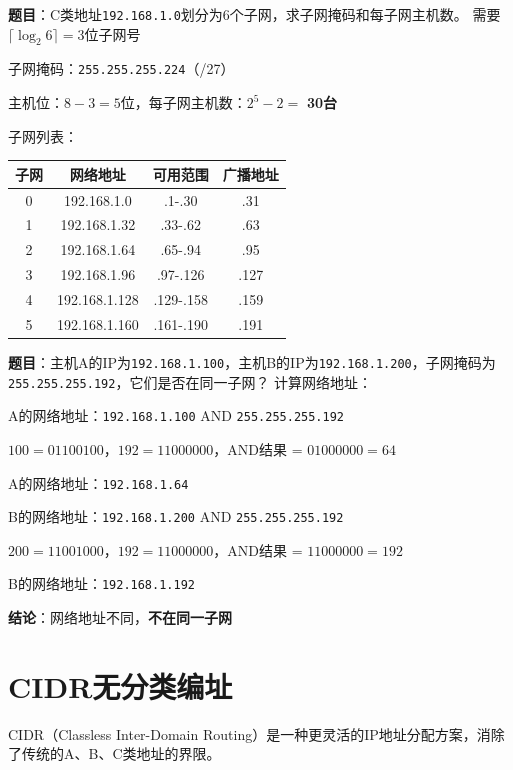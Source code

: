 \documentclass[12pt,a4paper,openany]{ctexbook}
\begin{document}
\begin{examplebox}[例题4.1 子网划分]
\textbf{题目}：C类地址\texttt{192.168.1.0}划分为6个子网，求子网掩码和每子网主机数。
\tcblower
需要$\lceil\log_2 6\rceil = 3$位子网号

子网掩码：\texttt{255.255.255.224}（/27）

主机位：$8-3=5$位，每子网主机数：$2^5-2=$ \textbf{30台}

子网列表：
\begin{center}\small
\begin{tabular}{|c|c|c|c|}
\hline
子网 & 网络地址 & 可用范围 & 广播地址 \\
\hline
0 & 192.168.1.0 & .1-.30 & .31 \\
1 & 192.168.1.32 & .33-.62 & .63 \\
2 & 192.168.1.64 & .65-.94 & .95 \\
3 & 192.168.1.96 & .97-.126 & .127 \\
4 & 192.168.1.128 & .129-.158 & .159 \\
5 & 192.168.1.160 & .161-.190 & .191 \\
\hline
\end{tabular}
\end{center}
\end{examplebox}

\begin{examplebox}[例题4.1b 判断同一子网]
\textbf{题目}：主机A的IP为\texttt{192.168.1.100}，主机B的IP为\texttt{192.168.1.200}，子网掩码为\texttt{255.255.255.192}，它们是否在同一子网？
\tcblower
计算网络地址：

A的网络地址：\texttt{192.168.1.100} AND \texttt{255.255.255.192}

$100 = 01100100$，$192 = 11000000$，AND结果 = $01000000 = 64$

A的网络地址：\texttt{192.168.1.64}

B的网络地址：\texttt{192.168.1.200} AND \texttt{255.255.255.192}

$200 = 11001000$，$192 = 11000000$，AND结果 = $11000000 = 192$

B的网络地址：\texttt{192.168.1.192}

\textbf{结论}：网络地址不同，\textbf{不在同一子网}
\end{examplebox}

\section{CIDR无分类编址}
CIDR（Classless Inter-Domain Routing）是一种更灵活的IP地址分配方案，消除了传统的A、B、C类地址的界限。
\end{document}

